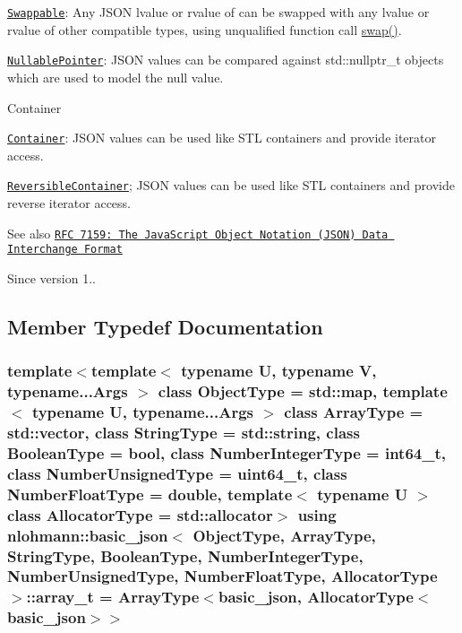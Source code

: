 \begin{DoxyItemize}
\begin{DoxyItemize}
\item \href{http://en.cppreference.com/w/cpp/concept/Swappable}{\tt Swappable}\+: Any J\+S\+ON lvalue or rvalue of can be swapped with any lvalue or rvalue of other compatible types, using unqualified function call \hyperlink{a00025_af77614992e38b355b9213940051cc582}{swap()}.
\item \href{http://en.cppreference.com/w/cpp/concept/NullablePointer}{\tt Nullable\+Pointer}\+: J\+S\+ON values can be compared against {\ttfamily std\+::nullptr\+\_\+t} objects which are used to model the {\ttfamily null} value.
\end{DoxyItemize}
\item Container
\begin{DoxyItemize}
\item \href{http://en.cppreference.com/w/cpp/concept/Container}{\tt Container}\+: J\+S\+ON values can be used like S\+TL containers and provide iterator access.
\item \href{http://en.cppreference.com/w/cpp/concept/ReversibleContainer}{\tt Reversible\+Container}; J\+S\+ON values can be used like S\+TL containers and provide reverse iterator access.
\end{DoxyItemize}
\end{DoxyItemize}

\begin{DoxySeeAlso}{See also}
\href{http://rfc7159.net/rfc7159}{\tt R\+FC 7159\+: The Java\+Script Object Notation (J\+S\+ON) Data Interchange Format}
\end{DoxySeeAlso}
\begin{DoxySince}{Since}
version 1.. 
\end{DoxySince}


\subsection{Member Typedef Documentation}
\subsubsection[{\texorpdfstring{array\+\_\+t}{array\_t}}]{\setlength{\rightskip}{0pt plus 5cm}template$<$template$<$ typename U, typename V, typename...\+Args $>$ class Object\+Type = std\+::map, template$<$ typename U, typename...\+Args $>$ class Array\+Type = std\+::vector, class String\+Type  = std\+::string, class Boolean\+Type  = bool, class Number\+Integer\+Type  = int64\+\_\+t, class Number\+Unsigned\+Type  = uint64\+\_\+t, class Number\+Float\+Type  = double, template$<$ typename U $>$ class Allocator\+Type = std\+::allocator$>$ using {\bf nlohmann\+::basic\+\_\+json}$<$ Object\+Type, Array\+Type, String\+Type, Boolean\+Type, Number\+Integer\+Type, Number\+Unsigned\+Type, Number\+Float\+Type, Allocator\+Type $>$\+::{\bf array\+\_\+t} =  Array\+Type$<${\bf basic\+\_\+json}, Allocator\+Type$<${\bf basic\+\_\+json}$>$$>$}\hypertarget{a00025_ab00b882d39306d663c23dab110f5cae0}{}\label{a00025_ab00b882d39306d663c23dab110f5cae0}


